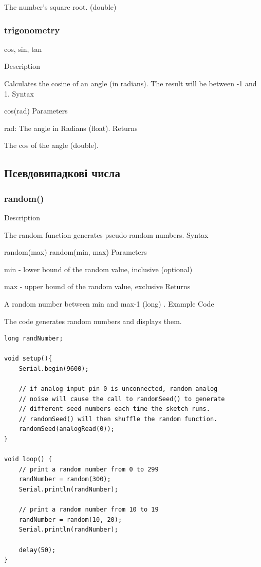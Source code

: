 \documentclass[12pt,a4paper]{report}  %
\begin{document}
The number’s square root. (double)

\subsubsection{trigonometry}\label{cos}

cos, sin, tan

Description

Calculates the cosine of an angle (in radians). The result will be between -1 and 1.
Syntax

cos(rad)
Parameters

rad: The angle in Radians (float).
Returns

The cos of the angle (double).

\subsection{Псевдовипадкові числа}

\subsubsection{random()}\label{random}

Description

The random function generates pseudo-random numbers.
Syntax

random(max)
random(min, max)
Parameters

min - lower bound of the random value, inclusive (optional)

max - upper bound of the random value, exclusive
Returns

A random number between min and max-1 (long) .
Example Code

The code generates random numbers and displays them.

\begin{lstlisting}[label=digitalwrite,caption=random]
long randNumber;

void setup(){
	Serial.begin(9600);

	// if analog input pin 0 is unconnected, random analog
	// noise will cause the call to randomSeed() to generate
	// different seed numbers each time the sketch runs.
	// randomSeed() will then shuffle the random function.
	randomSeed(analogRead(0));
}

void loop() {
	// print a random number from 0 to 299
	randNumber = random(300);
	Serial.println(randNumber);

	// print a random number from 10 to 19
	randNumber = random(10, 20);
	Serial.println(randNumber);

	delay(50);
}
\end{lstlisting}
\end{document}
